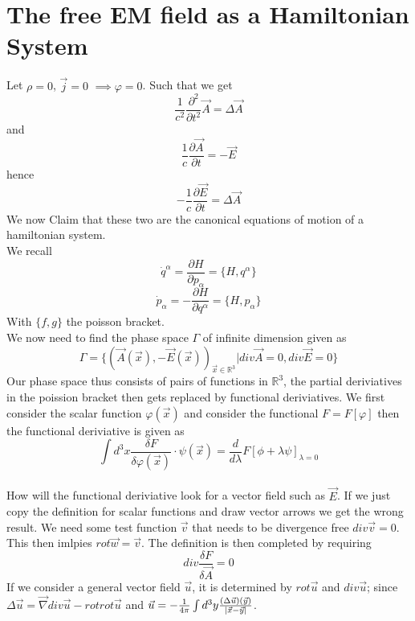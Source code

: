 \documentclass{report}
\begin{document}
\section{The free EM field as a Hamiltonian System}
Let $\rho = 0$, $\vec{j} = 0$ $\implies \varphi = 0$. Such that we get \[
\frac{1}{c^2} \frac{\partial^2 }{\partial t^2}\vec{A} = \Delta \vec{A}
\] and  \[
\frac{1}{c}\frac{\partial \vec{A} }{\partial t } = - \vec{E}
\] 
hence \[
-\frac{1}{c} \frac{\partial \vec{E}}{\partial t} = \Delta \vec{A}
\] 
We now Claim that these two are the canonical equations of motion of a hamiltonian system.\\
We recall \[
  \dot{q}^{\alpha} = \frac{\partial H}{\partial p_\alpha} = \{H, q^\alpha\} 
\] \[
 \dot{p}_\alpha = - \frac{\partial H}{\partial q^\alpha} = \{H, p_\alpha\}
\] 
With $\{f,g\}$ the poisson bracket.\\
We now need to find the phase space $\Gamma$ of infinite dimension given as \[
  \Gamma = \{\left( \vec{A}\left( \vec{x} \right), - \vec{E}\left( \vec{x} \right)  \right)_{\vec{x} \in \mathbb{R}^{3}} | div \vec{A} = 0, div \vec{E} = 0 \}
\] 
Our phase space thus consists of pairs of functions in $\mathbb{R}^{3}$, the partial deriviatives in the poission bracket then gets replaced by functional deriviatives. We first consider the scalar function $\varphi\left( \vec{x} \right) $ and consider the functional $F = F[\varphi]$ then the functional deriviative is given as \[
  \int d^{3}x \frac{\delta F}{\delta \varphi\left( \vec{x} \right) } \cdot \psi\left( \vec{x} \right) = \frac{d}{d\lambda}  F[\phi + \lambda\psi]_{\lambda = 0}
\] \\
How will the functional deriviative look for a vector field such as $\vec{E}$. If we just copy the definition for scalar functions and draw vector arrows we get the wrong result. We need some test function $\vec{v}$ that needs to be divergence free $div \vec{v} = 0$. This then imlpies $rot \vec{w} = \vec{v}$. The definition is then completed by requiring \[
div \frac{\delta F}{\delta \vec{A}} = 0
\]  
If we consider a general vector field $ \vec{u}$, it is determined by $rot \vec{u}$ and $div \vec{u}$; since $\Delta \vec{u} = \vec{\nabla } div \vec{u} - rot rot \vec{u}$ and $\vec{u} = -\frac{1}{4 \pi} \int d^{3}y \frac{\left( \Delta \vec{u} \right) \left( \vec{y} \right) }{\abs{\vec{x} - \vec{y}}}$.\\
\end{document}
